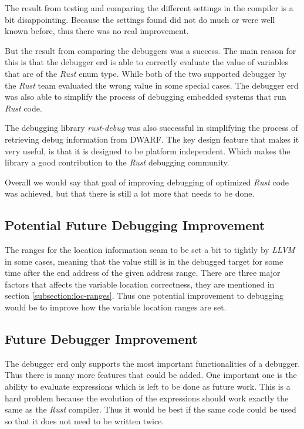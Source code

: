 
The result from testing and comparing the different settings in the compiler is a bit disappointing.
Because the settings found did not do much or were well known before, thus there was no real improvement.


But the result from comparing the debuggers was a success.
The main reason for this is that the debugger \gls{erd} is able to correctly evaluate the value of variables that are of the \emph{Rust} enum type.
While both of the two supported debugger by the \emph{Rust} team evaluated the wrong value in some special cases.
The debugger \gls{erd} was also able to simplify the process of debugging embedded systems that run \emph{Rust} code.


The debugging library \emph{rust-debug} was also successful in simplifying the process of retrieving debug information from \gls{DWARF}.
The key design feature that makes it very useful, is that it is designed to be platform independent.
Which makes the library a good contribution to the \emph{Rust} debugging community.


Overall we would say that goal of improving debugging of optimized \emph{Rust} code was achieved, but that there is still a lot more that needs to be done.


\subsection{Potential Future Debugging Improvement}
The ranges for the location information seam to be set a bit to tightly by \emph{LLVM} in some cases, meaning that the value still is in the debugged target for some time after the end address of the given address range.
There are three major factors that affects the variable location correctness, they are mentioned in section \ref{subsection:loc-ranges}.
Thus one potential improvement to debugging would be to improve how the variable location ranges are set.


\subsection{Future Debugger Improvement}
The debugger \gls{erd} only supports the most important functionalities of a debugger.
Thus there is many more features that could be added.
One important one is the ability to evaluate expressions which is left to be done as future work.
This is a hard problem because the evolution of the expressions should work exactly the same as the \emph{Rust} compiler.
Thus it would be best if the same code could be used so that it does not need to be written twice.


